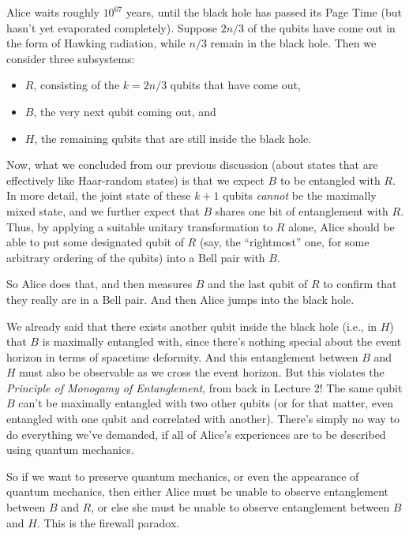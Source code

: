\documentclass[11pt]{report}
\theoremstyle{plain}
\theoremstyle{definition}
\begin{document}
Alice waits roughly $10^{67}$ years, until the black hole has passed its Page Time (but hasn't yet evaporated completely).
Suppose $2n/3$ of the qubits
have come out in the form of Hawking radiation, while $n/3$ remain in the black hole.
Then we consider three subsystems:
\begin{itemize}
\item $R$, consisting of the $k=2n/3$ qubits that have come out,
\item $B$, the very next qubit coming out, and
\item $H$, the remaining qubits that are still inside the black hole.
\end{itemize}
Now, what we concluded from our previous discussion (about states
that are effectively like Haar-random states) is that we
expect $B$ to be entangled with $R$.
In more detail, the joint state of these $k+1$ qubits {\em cannot} be the maximally
mixed state, and we further expect that $B$ shares one bit of entanglement with $R$.
Thus, by applying
a suitable unitary transformation to $R$ alone, Alice should be able to put some designated qubit of $R$ (say,
the ``rightmost'' one, for some arbitrary ordering of the qubits) into a Bell pair with $B$.

So Alice does that, and then measures $B$ and the last qubit of $R$ to confirm that they really are in a Bell pair.  And then Alice jumps into the black hole.

We already said that there exists another qubit
inside the black hole (i.e., in $H$) that $B$ is maximally entangled with, since there's nothing special about the event horizon
in terms of spacetime deformity.
And this entanglement between $B$ and $H$ must also be observable as we cross the event horizon.
But this violates the {\em Principle of Monogamy of Entanglement}, from back in Lecture 2!  The same qubit $B$ can't be maximally entangled with two other qubits (or for that matter, even entangled with one qubit and correlated with another).  There's simply no way to do everything we've demanded,
if all of Alice's experiences are to be described using quantum mechanics.

So if we want to preserve quantum mechanics, or even the appearance of quantum mechanics, then either Alice must be unable to observe entanglement between $B$ and $R$, or
else she must be unable to observe entanglement between $B$ and $H$.  This is the firewall paradox.
\end{document}
